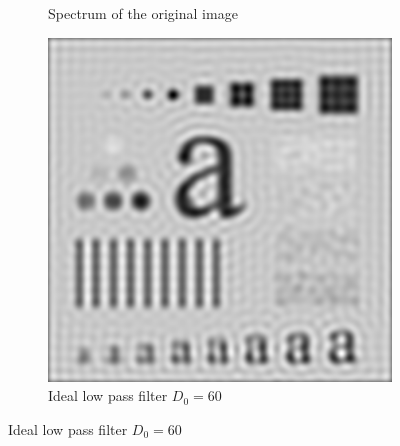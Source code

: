 \documentclass[UTF8]{ctexart}
\begin{document}
\begin{figure}[htbp]
\begin{subfigure}{0.3\textwidth}
        \caption{Spectrum of the original image}
    \end{subfigure}%
    \hfill
    \begin{subfigure}{0.3\textwidth}
        \centering
        \includegraphics[width=\linewidth]{pattern_ilpf.png}
        \caption{Ideal low pass filter $D_0 = 60$}
    \end{subfigure}

    \vspace{0.5cm} %


\end{figure}
\end{document}
